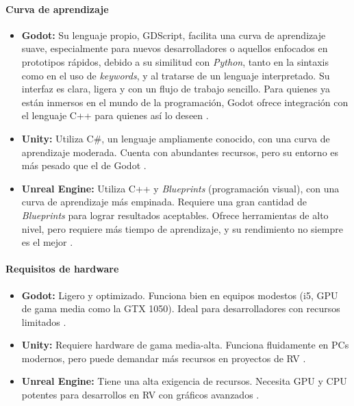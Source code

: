 \documentclass[journal,article,accept,pdftex,moreauthors]{Definitions/mdpi}
\begin{document}
\paragraph{Curva de aprendizaje}
\begin{itemize}
    \item \textbf{Godot:} Su lenguaje propio, GDScript, facilita una curva de aprendizaje suave, especialmente para nuevos desarrolladores o aquellos enfocados en prototipos rápidos, debido a su similitud con \textit{Python}, tanto en la sintaxis como en el uso de \textit{keywords}, y al tratarse de un lenguaje interpretado. Su interfaz es clara, ligera y con un flujo de trabajo sencillo. Para quienes ya están inmersos en el mundo de la programación, Godot ofrece integración con el lenguaje C++ para quienes así lo deseen \cite{godotDocs2024}.
    
    \item \textbf{Unity:} Utiliza C\#, un lenguaje ampliamente conocido, con una curva de aprendizaje moderada. Cuenta con abundantes recursos, pero su entorno es más pesado que el de Godot \cite{unityDocs2024}.
    
    \item \textbf{Unreal Engine:} Utiliza C++ y \textit{Blueprints} (programación visual), con una curva de aprendizaje más empinada. Requiere una gran cantidad de \textit{Blueprints} para lograr resultados aceptables. Ofrece herramientas de alto nivel, pero requiere más tiempo de aprendizaje, y su rendimiento no siempre es el mejor \cite{unrealDocs2024}.
\end{itemize}

\paragraph{Requisitos de hardware}
\begin{itemize}
    \item \textbf{Godot:} Ligero y optimizado. Funciona bien en equipos modestos (i5, GPU de gama media como la GTX 1050). Ideal para desarrolladores con recursos limitados \cite{godotDocs2024}.
    
    \item \textbf{Unity:} Requiere hardware de gama media-alta. Funciona fluidamente en PCs modernos, pero puede demandar más recursos en proyectos de RV \cite{unityDocs2024}.
    
    \item \textbf{Unreal Engine:} Tiene una alta exigencia de recursos. Necesita GPU y CPU potentes para desarrollos en RV con gráficos avanzados \cite{unrealDocs2024}.
\end{itemize}
\end{document}
